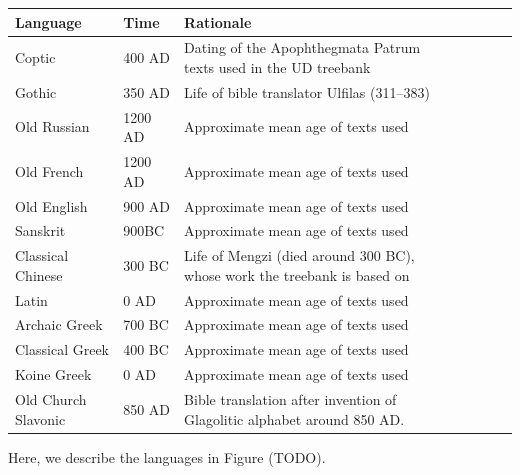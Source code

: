 \documentclass[11pt,a4paper]{article}
\begin{document}
\begin{tabular}{llp{10cm}llll}
Language & Time & Rationale \\ \hline
Coptic & 400 AD & Dating of the Apophthegmata Patrum texts used in the UD treebank\\
Gothic & 350 AD & Life of bible translator Ulfilas (311--383)\\
Old Russian & 1200 AD & Approximate mean age of texts used\\
Old French & 1200 AD  & Approximate mean age of texts used\\
Old English & 900 AD & Approximate mean age of texts used \\
Sanskrit & 900BC & Approximate mean age of texts used \\
Classical Chinese & 300 BC & Life of Mengzi (died around 300 BC), whose work the treebank is based on \\
Latin & 0 AD & Approximate mean age of texts used \\
Archaic Greek & 700 BC & Approximate mean age of texts used \\
Classical Greek & 400 BC & Approximate mean age of texts used \\
Koine Greek & 0 AD  & Approximate mean age of texts used\\
Old Church Slavonic & 850 AD &  Bible translation after invention of Glagolitic alphabet around 850 AD. \\
\end{tabular}

Here, we describe the languages in Figure (TODO).
\end{document}
